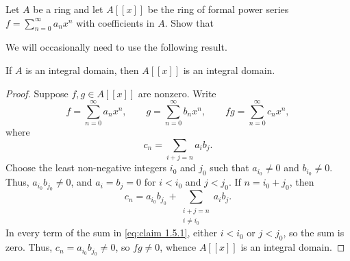 \begin{exercise}
Let \(A\) be a ring and let \(A[[x]]\) be the ring of formal power series \(f = \sum_{n=0}^\infty a_n x^n\) with coefficients in \(A\).
Show that
\end{exercise}

We will occasionally need to use the following result.

\begin{claim}
\label{claim:1.5.1}
If \(A\) is an integral domain, then \(A[[x]]\) is an integral domain.
\end{claim}

\begin{proof}
Suppose \(f,g\in A[[x]]\) are nonzero.
Write
\begin{equation*}
f = \sum_{n=0}^\infty a_n x^n,
\qquad
g = \sum_{n=0}^\infty b_n x^n,
\qquad
f g = \sum_{n=0}^\infty c_n x^n,
\end{equation*}
where
\begin{equation*}
c_n = \sum_{i + j = n} a_i b_j.
\end{equation*}
Choose the least non-negative integers \(i_0\) and \(j_0\) such that \(a_{i_0} \neq 0\) and \(b_{i_0} \neq 0\).
Thus, \(a_{i_0} b_{j_0} \neq 0\), and \(a_i = b_j = 0\) for \(i < i_0\) and \(j < j_0\).
If \(n = i_0 + j_0\), then
\begin{equation}
\label{eq:claim 1.5.1}
c_n = a_{i_0} b_{j_0} + \sum_{\substack{i + j = n \\ i \neq i_0}} a_i b_j.
\end{equation}
In every term of the sum in \eqref{eq:claim 1.5.1}, either \(i < i_0\) or \(j < j_0\), so the sum is zero. Thus, \(c_n = a_{i_0} b_{j_0} \neq 0\), so \(f g \neq 0\), whence \(A[[x]]\) is an integral domain.
\end{proof}